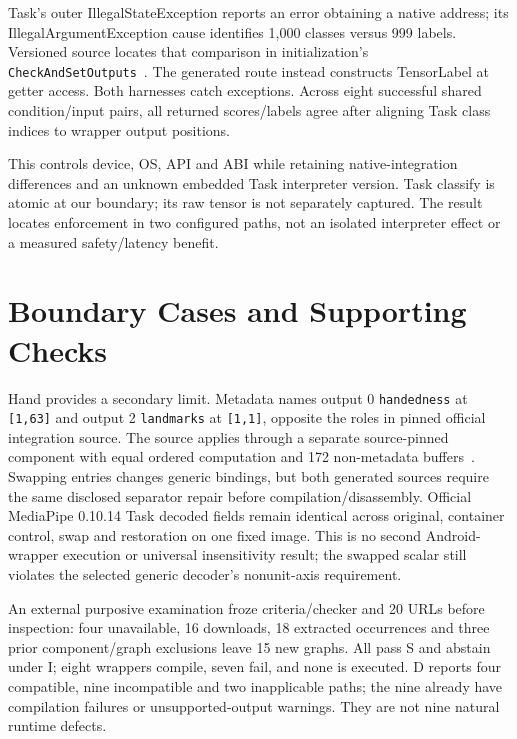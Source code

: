 \documentclass[10pt,conference]{IEEEtran}
\newcommand{\code}[1]{\texttt{#1}}
\begin{document}
Task's outer IllegalStateException reports an error obtaining a native address; its IllegalArgumentException cause identifies 1,000 classes versus 999 labels. Versioned source locates that comparison in initialization's \code{CheckAndSetOutputs}~\cite{task-classifier}. The generated route instead constructs TensorLabel at getter access. Both harnesses catch exceptions. Across eight successful shared condition/input pairs, all returned scores/labels agree after aligning Task class indices to wrapper output positions.

This controls device, OS, API and ABI while retaining native-integration differences and an unknown embedded Task interpreter version. Task classify is atomic at our boundary; its raw tensor is not separately captured. The result locates enforcement in two configured paths, not an isolated interpreter effect or a measured safety/latency benefit.

\section{Boundary Cases and Supporting Checks}
\label{sec:hand}
Hand provides a secondary limit. Metadata names output 0 \code{handedness} at \code{[1,63]} and output 2 \code{landmarks} at \code{[1,1]}, opposite the roles in pinned official integration source. The source applies through a separate source-pinned component with equal ordered computation and 172 non-metadata buffers~\cite{hand-graph,hand-assets}. Swapping entries changes generic bindings, but both generated sources require the same disclosed separator repair before compilation/disassembly. Official MediaPipe 0.10.14 Task decoded fields remain identical across original, container control, swap and restoration on one fixed image. This is no second Android-wrapper execution or universal insensitivity result; the swapped scalar still violates the selected generic decoder's nonunit-axis requirement.

\label{sec:preflight}
An external purposive examination froze criteria/checker and 20 URLs before inspection: four unavailable, 16 downloads, 18 extracted occurrences and three prior component/graph exclusions leave 15 new graphs. All pass S and abstain under I; eight wrappers compile, seven fail, and none is executed. D reports four compatible, nine incompatible and two inapplicable paths; the nine already have compilation failures or unsupported-output warnings. They are not nine natural runtime defects.
\end{document}
